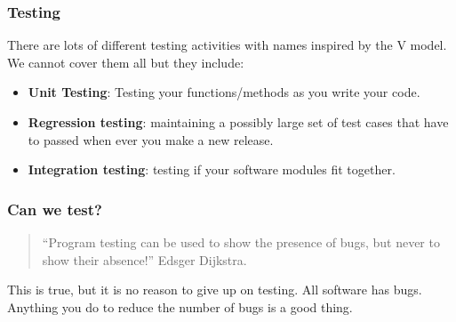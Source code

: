 \documentclass{beamer}
\begin{document}
\begin{frame}
  \frametitle{Testing}

  There are lots of different testing activities with names inspired
  by the V model.  We cannot cover them all but they include:
  \begin{itemize}
  \item \textbf{Unit Testing}: Testing your functions/methods as you write your
    code.
  \item \textbf{Regression testing}: maintaining a possibly large set of test
    cases that have to passed when ever you make a new release.
  \item \textbf{Integration testing}: testing  if your software modules fit
    together. 
  \end{itemize}
\end{frame}
\begin{frame}
  \frametitle{Can we test?}
  
  \begin{quote}
    ``Program testing can be used to show the presence of bugs, but
    never to show their absence!'' Edsger Dijkstra.
  \end{quote}


This is true, but it is no reason to give up on testing. All software has
bugs. Anything you do to reduce the number of bugs is a good thing.
\end{frame}

\end{document}
